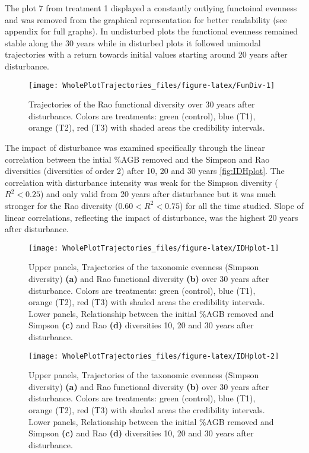 \documentclass[fleqn,10pt]{ArtEcoFoG} %
\theoremstyle{definition}
\theoremstyle{definition}
\theoremstyle{definition}
\theoremstyle{remark}
\begin{document}
The plot 7 from treatment 1 displayed a constantly outlying functoinal
evenness and was removed from the graphical representation for better
readability (see appendix for full graphs). In undisturbed plots the
functional evenness remained stable along the 30 years while in
disturbed plots it followed unimodal trajectories with a return towards
initial values starting around 20 years after disturbance.

\begin{figure}

{\centering \texttt{[image: WholePlotTrajectories\_files/figure-latex/FunDiv-1]} 

}

\caption{Trajectories of the Rao functional diversity over 30 years after disturbance. Colors are treatments: green (control), blue (T1), orange (T2), red (T3) with shaded areas the credibility intervals.}\label{fig:FunDiv}
\end{figure}

The impact of disturbance was examined specifically through the linear
correlation between the intial \%AGB removed and the Simpson and Rao
diversities (diversities of order 2) after 10, 20 and 30 years
\ref{fig:IDHplot}. The correlation with disturbance intensity was weak
for the Simpson diversity (\(R^2<0.25\)) and only valid from 20 years
after disturbance but it was much stronger for the Rao diversity
(\(0.60<R^2<0.75\)) for all the time studied. Slope of linear
correlations, reflecting the impact of disturbance, was the highest 20
years after disturbance.

\begin{figure*}

{\centering \texttt{[image: WholePlotTrajectories\_files/figure-latex/IDHplot-1]} 

}

\caption{Upper panels, Trajectories of the taxonomic evenness (Simpson diversity) \textbf{(a)} and Rao functional diversity \textbf{(b)} over 30 years after disturbance. Colors are treatments: green (control), blue (T1), orange (T2), red (T3) with shaded areas the credibility intervals. Lower panels, Relationship between the initial \%AGB removed and Simpson \textbf{(c)} and Rao \textbf{(d)} diversities 10, 20 and 30 years after disturbance.}\label{fig:IDHplot1}
\end{figure*}\begin{figure*}

{\centering \texttt{[image: WholePlotTrajectories\_files/figure-latex/IDHplot-2]} 

}

\caption{Upper panels, Trajectories of the taxonomic evenness (Simpson diversity) \textbf{(a)} and Rao functional diversity \textbf{(b)} over 30 years after disturbance. Colors are treatments: green (control), blue (T1), orange (T2), red (T3) with shaded areas the credibility intervals. Lower panels, Relationship between the initial \%AGB removed and Simpson \textbf{(c)} and Rao \textbf{(d)} diversities 10, 20 and 30 years after disturbance.}\label{fig:IDHplot2}
\end{figure*}
\end{document}

